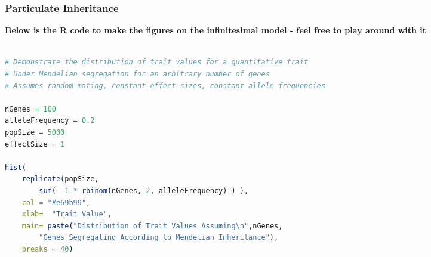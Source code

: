 \documentclass{beamer}
\begin{document}
\begin{frame}[fragile]
	\frametitle{Particulate Inheritance}
	
	\textbf{Below is the R code to make the figures on the infinitesimal model - feel free to play around with it}
	\begin{adjustbox}{max width=\textwidth}
		
	\begin{lstlisting}[language=R]

# Demonstrate the distribution of trait values for a quantitative trait
# Under Mendelian segregation for an arbitrary number of genes
# Assumes random mating, constant effect sizes, constant allele frequencies
	
nGenes = 100
alleleFrequency = 0.2
popSize = 5000
effectSize = 1
			
hist( 
	replicate(popSize,
		sum(  1 * rbinom(nGenes, 2, alleleFrequency) ) ),
	col = "#e69b99",
	xlab=  "Trait Value",
	main= paste("Distribution of Trait Values Assuming\n",nGenes, 
		"Genes Segregating According to Mendelian Inheritance"),
	breaks = 40)
		\end{lstlisting}
\end{adjustbox}
\end{frame}
\end{document}
